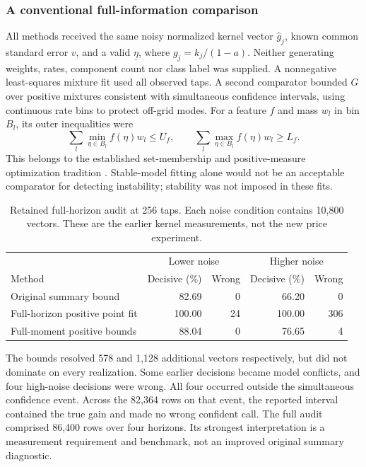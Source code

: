 \documentclass[10pt,twocolumn,letterpaper]{article}
\theoremstyle{definition}
\theoremstyle{remark}
\begin{document}
\subsubsection{A conventional full-information comparison}
All methods received the same noisy normalized kernel vector $\widehat g_j$, known common standard error $v$, and a valid $\underline\eta$, where $g_j=k_j/(1-a)$. Neither generating weights, rates, component count nor class label was supplied. A nonnegative least-squares mixture fit used all observed taps. A second comparator bounded $G$ over positive mixtures consistent with simultaneous confidence intervals, using continuous rate bins to protect off-grid modes. For a feature $f$ and mass $w_l$ in bin $B_l$, its outer inequalities were
\[
 \sum_l \min_{\eta\in B_l} f(\eta)w_l\le U_f,
 \qquad
 \sum_l \max_{\eta\in B_l} f(\eta)w_l\ge L_f.
\]
This belongs to the established set-membership and positive-measure optimization tradition \citep{kosut1992,bertsimas2005}. Stable-model fitting alone would not be an acceptable comparator for detecting instability; stability was not imposed in these fits.

\begin{table}[htbp]
\centering\small
\caption{Retained full-horizon audit at 256 taps. Each noise condition contains 10,800 vectors. These are the earlier kernel measurements, not the new price experiment.}
\label{tab:retained_comparison}
\begin{tabular}{p{}rrrr}\toprule
 & \multicolumn{2}{c}{Lower noise} & \multicolumn{2}{c}{Higher noise}\\
Method & Decisive (\%) & Wrong & Decisive (\%) & Wrong\\\midrule
Original summary bound & 82.69 & 0 & 66.20 & 0\\
Full-horizon positive point fit & 100.00 & 24 & 100.00 & 306\\
Full-moment positive bounds & 88.04 & 0 & 76.65 & 4\\\bottomrule
\end{tabular}
\end{table}

The bounds resolved 578 and 1,128 additional vectors respectively, but did not dominate on every realization. Some earlier decisions became model conflicts, and four high-noise decisions were wrong. All four occurred outside the simultaneous confidence event. Across the 82,364 rows on that event, the reported interval contained the true gain and made no wrong confident call. The full audit comprised 86,400 rows over four horizons. Its strongest interpretation is a measurement requirement and benchmark, not an improved original summary diagnostic.
\end{document}
